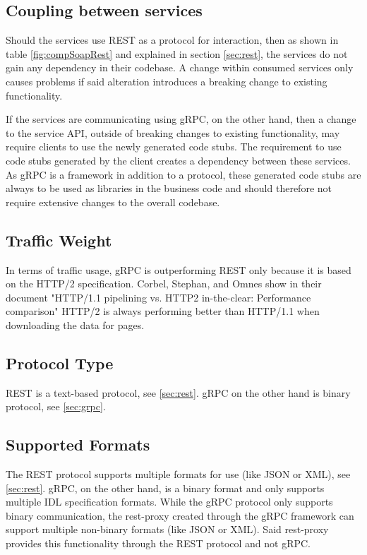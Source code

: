 \documentclass[conference]{IEEEtran}
\begin{document}
\subsection{Coupling between services}

Should the services use REST as a protocol for interaction, then as shown in table \ref{fig:compSoapRest} and explained in section \ref{sec:rest}, the services do not gain any dependency in their codebase. A change within consumed services only causes problems if said alteration introduces a breaking change to existing functionality.

If the services are communicating using gRPC, on the other hand, then a change to the service API, outside of breaking changes to existing functionality, may require clients to use the newly generated code stubs. The requirement to use code stubs generated by the client creates a dependency between these services. As gRPC is a framework in addition to a protocol, these generated code stubs are always to be used as libraries in the business code and should therefore not require extensive changes to the overall codebase.

\subsection{Traffic Weight}

In terms of traffic usage, gRPC is outperforming REST only because it is based on the HTTP/2 specification. Corbel, Stephan, and Omnes show in their document "HTTP/1.1 pipelining vs. HTTP2 in-the-clear: Performance comparison" \cite{7745823} HTTP/2 is always performing better than HTTP/1.1 when downloading the data for pages.

\subsection{Protocol Type}

REST is a text-based protocol, see \ref{sec:rest}. gRPC on the other hand is binary protocol, see \ref{sec:grpc}.

\subsection{Supported Formats}

The REST protocol supports multiple formats for use (like JSON or XML), see \ref{sec:rest}. gRPC, on the other hand, is a binary format and only supports multiple IDL specification formats. While the gRPC protocol only supports binary communication, the rest-proxy created through the gRPC framework can support multiple non-binary formats (like JSON or XML). Said rest-proxy provides this functionality through the REST protocol and not gRPC.
\end{document}
